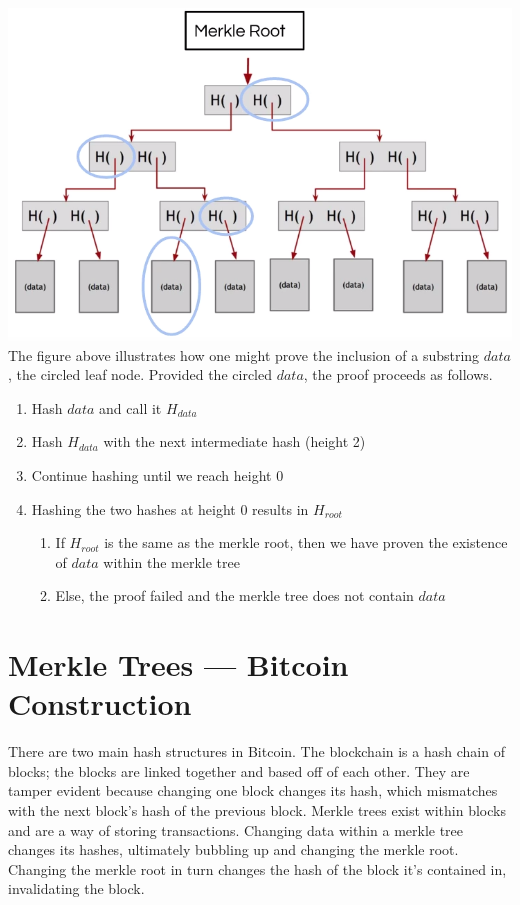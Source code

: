 \documentclass[11pt]{article}
\begin{document}
 \includegraphics[scale=0.4]{merkle_proof} \\
 
 The figure above illustrates how one might prove the inclusion of a substring $data$, the circled leaf node. Provided the circled $data$, the proof proceeds as follows.
 
 \begin{enumerate}
     \item Hash $data$ and call it $H_{data}$
     \item Hash $H_{data}$ with the next intermediate hash (height 2)
     \item Continue hashing until we reach height 0
     \item Hashing the two hashes at height 0 results in $H_{root}$
     \begin{enumerate}
         \item If $H_{root}$ is the same as the merkle root, then we have proven the existence of $data$ within the merkle tree
         \item Else, the proof failed and the merkle tree does not contain $data$
     \end{enumerate}
 \end{enumerate}
 
 \section*{Merkle Trees --- Bitcoin Construction}
 
 There are two main hash structures in Bitcoin. The blockchain is a hash chain of blocks; the blocks are linked together and based off of each other. They are tamper evident because changing one block changes its hash, which mismatches with the next block's hash of the previous block. Merkle trees exist within blocks and are a way of storing transactions. Changing data within a merkle tree changes its hashes, ultimately bubbling up and changing the merkle root. Changing the merkle root in turn changes the hash of the block it's contained in, invalidating the block.
 
\end{document}
